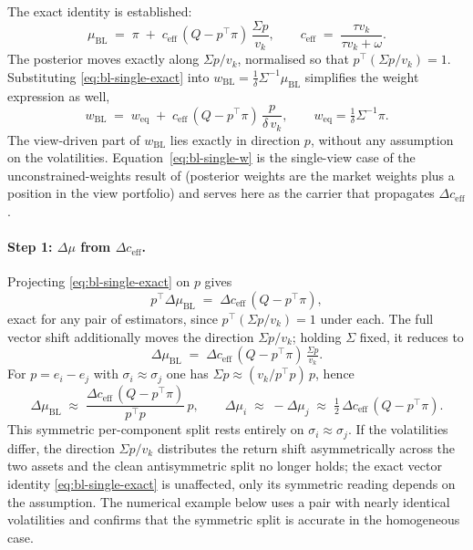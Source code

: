 \documentclass[a4paper,11pt]{article}
\theoremstyle{plain}
\theoremstyle{definition}
\newcommand{\muBL}{\mu_{\mathrm{BL}}}
\newcommand{\eff}{\mathrm{eff}}
\begin{document}
The exact identity is established:
\begin{equation}
\label{eq:bl-single-exact}
  \muBL \;=\; \pi \;+\; c_{\eff}\,(Q - p^\top\pi)\,\frac{\Sigma p}{v_k},
  \qquad c_{\eff} \;=\; \frac{\tau v_k}{\tau v_k + \omega}.
\end{equation}
The posterior moves exactly along $\Sigma p / v_k$, normalised so that
$p^\top(\Sigma p / v_k) = 1$. Substituting \eqref{eq:bl-single-exact}
into $w_{\mathrm{BL}} = \tfrac{1}{\delta}\Sigma^{-1}\muBL$ simplifies
the weight expression as well,
\begin{equation}
\label{eq:bl-single-w}
  w_{\mathrm{BL}} \;=\; w_{\mathrm{eq}} \;+\; c_{\eff}\,(Q - p^\top\pi)\,\frac{p}{\delta\,v_k},
  \qquad w_{\mathrm{eq}} = \tfrac{1}{\delta}\Sigma^{-1}\pi.
\end{equation}
The view-driven part of $w_{\mathrm{BL}}$ lies exactly in direction
$p$, without any assumption on the volatilities.
Equation~\eqref{eq:bl-single-w} is the single-view case of the
unconstrained-weights result of \citet{HeLitterman1999} (posterior
weights are the market weights plus a position in the view
portfolio) and serves here as the carrier that propagates
$\Delta c_{\eff}$.

\paragraph{Step 1: $\Delta\mu$ from $\Delta c_{\eff}$.}
Projecting \eqref{eq:bl-single-exact} on $p$ gives
\[
  p^\top \Delta\muBL \;=\; \Delta c_{\eff}\,(Q - p^\top\pi),
\]
exact for any pair of estimators, since $p^\top(\Sigma p / v_k) = 1$
under each. The full vector shift additionally moves the direction
$\Sigma p / v_k$; holding $\Sigma$ fixed, it reduces to
\[
  \Delta\muBL \;=\; \Delta c_{\eff}\,(Q - p^\top\pi)\,\tfrac{\Sigma p}{v_k}.
\]
For $p = e_i - e_j$ with $\sigma_i \approx \sigma_j$ one has
$\Sigma p \approx (v_k/p^\top p)\,p$, hence
\begin{equation}
\label{eq:dmu-vec}
  \Delta\muBL \;\approx\; \frac{\Delta c_{\eff}\,(Q - p^\top\pi)}{p^\top p}\,p,
  \qquad
  \Delta\mu_i \;\approx\; -\Delta\mu_j \;\approx\; \tfrac{1}{2}\,\Delta c_{\eff}\,(Q - p^\top\pi).
\end{equation}
This symmetric per-component split rests entirely on
$\sigma_i \approx \sigma_j$. If the volatilities differ, the direction
$\Sigma p / v_k$ distributes the return shift asymmetrically across the
two assets and the clean antisymmetric split no longer holds; the exact
vector identity \eqref{eq:bl-single-exact} is unaffected, only its
symmetric reading depends on the assumption. The numerical example below
uses a pair with nearly identical volatilities and confirms that the
symmetric split is accurate in the homogeneous case.
\end{document}

